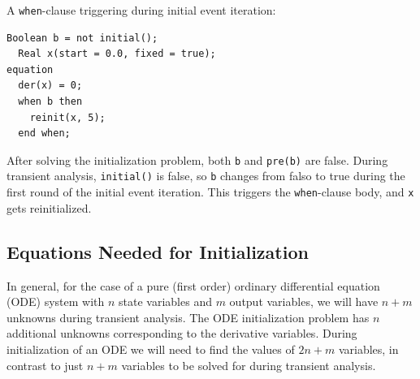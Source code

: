 \begin{example}
A \lstinline!when!-clause triggering during initial event iteration:
\begin{lstlisting}[language=modelica]
  Boolean b = not initial();
  Real x(start = 0.0, fixed = true);
equation
  der(x) = 0;
  when b then
    reinit(x, 5);
  end when;
\end{lstlisting}
After solving the initialization problem, both \lstinline!b! and \lstinline!pre(b)! are false.
During transient analysis, \lstinline!initial()! is false, so \lstinline!b! changes from falso to true during the first round of the initial event iteration.
This triggers the \lstinline!when!-clause body, and \lstinline!x! gets reinitialized.
\end{example}


\subsection{Equations Needed for Initialization}\label{the-number-of-equations-needed-for-initialization}\label{equations-needed-for-initialization}

\begin{nonnormative}
In general, for the case of a pure (first order) ordinary differential equation (ODE) system with $n$ state variables and $m$ output variables, we will have $n+m$ unknowns during transient analysis.
The ODE initialization problem has $n$ additional unknowns corresponding to the derivative variables.
During initialization of an ODE we will need to find the values of $2n+m$ variables, in contrast to just $n+m$ variables to be solved for during transient analysis.
\end{nonnormative}

